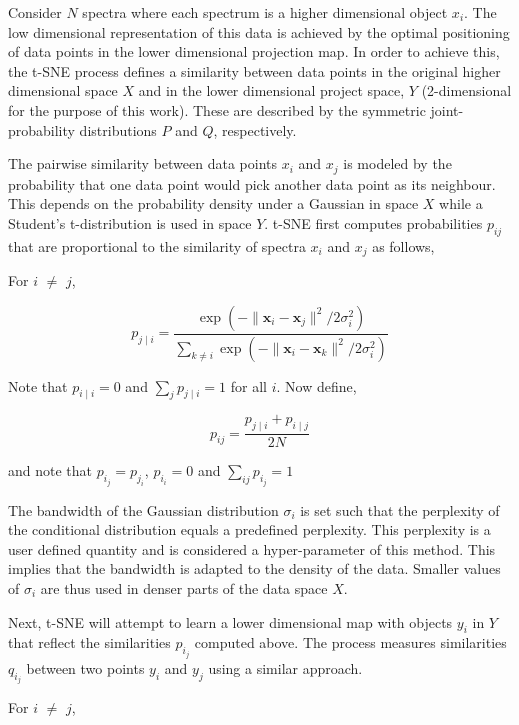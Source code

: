 Consider $N$ spectra where each spectrum is a higher dimensional object $x_i$. The low dimensional representation of this data is achieved by the optimal positioning of data points in the lower dimensional projection map. In order to achieve this, the t-SNE process defines a similarity between data points in the original higher dimensional space $X$ and in the lower dimensional project space, $Y$ (2-dimensional for the purpose of this work). These are described by the symmetric joint-probability distributions $P$ and $Q$, respectively.

The pairwise similarity between data points $x_i$ and $x_j$ is modeled by the probability that one data point would pick another data point as its neighbour. This depends on the probability density under a Gaussian in space $X$ while a Student's t-distribution is used in space $Y$. t-SNE first computes probabilities $p_{ij}$ that are proportional to the similarity of spectra $x_i$ and $x_j$ as follows,


For $i$ $\neq$ $j$,

\begin{equation}
p_{j\mid i}={\frac {\exp(-\lVert \mathbf {x} _{i}-\mathbf {x} _{j}\rVert ^{2}/2\sigma _{i}^{2})}{\sum _{k\neq i}\exp(-\lVert \mathbf {x} _{i}-\mathbf {x} _{k}\rVert ^{2}/2\sigma _{i}^{2})}}
\end{equation}

Note that $p_{i\mid i}=0$ and $\sum _{j}p_{j\mid i}=1$ for all $i$. Now define,

\begin{equation}
    p_{ij}={\frac {p_{j\mid i}+p_{i\mid j}}{2N}}
\end{equation}

and note that $p_i_j=p_j_i$, $p_i_i=0$ and $\sum _{ij} p_i_j=1$

The bandwidth of the Gaussian distribution $\sigma_i$ is set such that the perplexity of the conditional distribution equals a predefined perplexity. This perplexity is a user defined quantity and is considered a hyper-parameter of this method. This implies that the bandwidth is adapted to the density of the data. Smaller values of $\sigma_i$ are thus used in denser parts of the data space $X$. 

Next, t-SNE will attempt to learn a lower dimensional map with objects $y_i$ in $Y$ that reflect the similarities $p_i_j$ computed above. The process measures similarities $q_i_j$ between two points $y_i$ and $y_j$ using a similar approach. 

For $i$ $\neq$ $j$,

